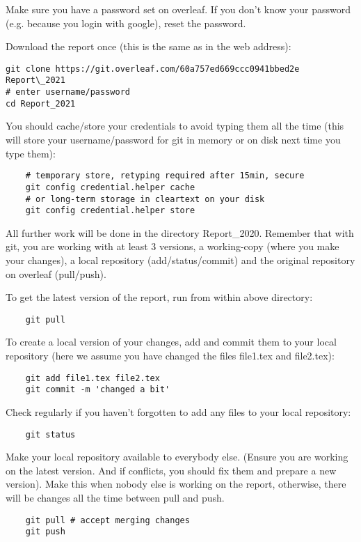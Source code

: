 Make sure you have a password set on overleaf. If you don't know your password (e.g. because you login with google), reset the password. 


Download the report once (this is the same as in the web address):
\begin{verbatim}
git clone https://git.overleaf.com/60a757ed669ccc0941bbed2e Report\_2021
# enter username/password
cd Report_2021
\end{verbatim}

You should cache/store your credentials to avoid typing them all the time (this will store your username/password for git in memory or on disk next time you type them):
\begin{verbatim}
    # temporary store, retyping required after 15min, secure
    git config credential.helper cache
    # or long-term storage in cleartext on your disk
    git config credential.helper store
\end{verbatim}

All further work will be done in the directory Report\_2020. Remember that with git, you are working with at least 3 versions, a working-copy (where you make your changes), a local repository (add/status/commit) and the original repository on overleaf (pull/push).

To get the latest version of the report, run from within above directory:
\begin{verbatim}
    git pull
\end{verbatim}

To create a local version of your changes, add and commit them to your local repository (here we assume you have changed the files file1.tex and file2.tex):

\begin{verbatim}
    git add file1.tex file2.tex
    git commit -m 'changed a bit'
\end{verbatim}

Check regularly if you haven't forgotten to add any files to your local repository:
\begin{verbatim}
    git status
\end{verbatim}

Make your local repository available to everybody else. (Ensure you are working on the latest version. And if conflicts, you should fix them and prepare a new version). Make this when nobody else is working on the report, otherwise, there will be changes all the time between pull and push.
\begin{verbatim}
    git pull # accept merging changes
    git push
\end{verbatim}

